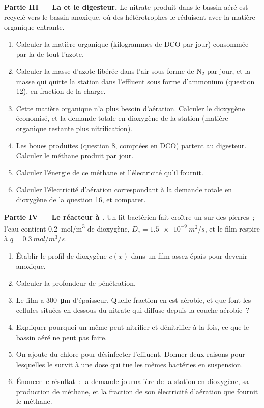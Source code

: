 \begin{problem}
\medskip
\noindent\textbf{Partie III --- La  et le digesteur.}
Le nitrate produit dans le bassin aéré est recyclé vers le bassin
anoxique, où des hétérotrophes le réduisent avec la matière organique
entrante.
\begin{enumerate}[resume]
  \item Calculer la matière organique (kilogrammes de DCO par jour)
        consommée par la  de tout l'azote.
  \item Calculer la masse d'azote libérée dans l'air sous forme de
        $\mathrm{N_2}$ par jour, et la masse qui quitte la station dans
        l'effluent sous forme d'ammonium (question 12), en fraction de la
        charge.
  \item Cette matière organique n'a plus besoin d'aération. Calculer le
        dioxygène économisé, et la demande totale en dioxygène de la
        station (matière organique restante plus nitrification).
  \item Les boues produites (question 8, comptées en DCO) partent au
        digesteur. Calculer le méthane produit par jour.
  \item Calculer l'énergie de ce méthane et l'électricité qu'il fournit.
  \item Calculer l'électricité d'aération correspondant à la demande
        totale en dioxygène de la question 16, et comparer.
\end{enumerate}

\medskip
\noindent\textbf{Partie IV --- Le réacteur à .}
Un lit bactérien fait croître un  sur des pierres~; l'eau
contient \qty{0.2}{mol/m^3} de dioxygène, $D_e = \qty{1.5e-9}{m^2/s}$, et
le film respire à $q = \qty{0.3}{mol/m^3/s}$.
\begin{enumerate}[resume]
  \item Établir le profil de dioxygène $c(x)$ dans un film assez épais
        pour devenir anoxique.
  \item Calculer la profondeur de pénétration.
  \item Le film a \qty{300}{\micro m} d'épaisseur. Quelle fraction en est
        aérobie, et que font les cellules situées en dessous du nitrate
        qui diffuse depuis la couche aérobie~?
  \item Expliquer pourquoi un même  peut nitrifier et dénitrifier
        à la fois, ce que le bassin aéré ne peut pas faire.
  \item On ajoute du chlore pour désinfecter l'effluent. Donner deux
        raisons pour lesquelles le  survit à une dose qui tue les
        mêmes bactéries en suspension.
  \item Énoncer le résultat~: la demande journalière de la station en
        dioxygène, sa production de méthane, et la fraction de son
        électricité d'aération que fournit le méthane.
\end{enumerate}
\end{problem}
